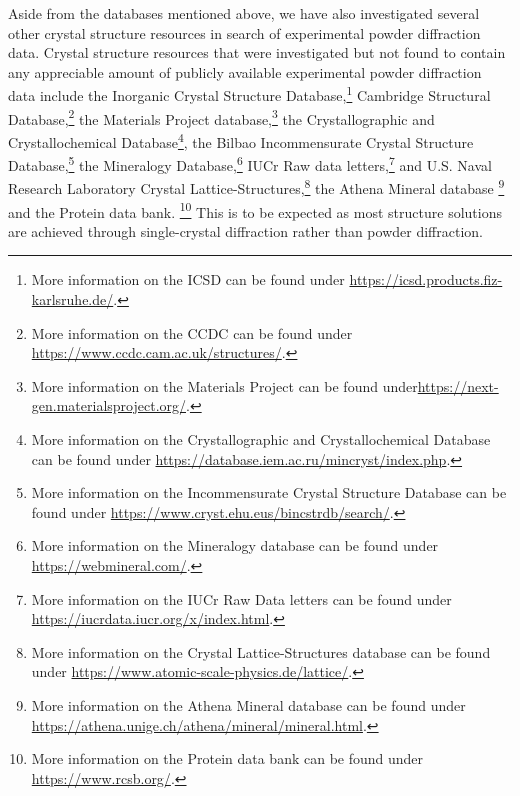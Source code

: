 Aside from the databases mentioned above, we have also investigated several other crystal structure resources in search of experimental powder diffraction data. Crystal structure resources that were investigated but not found to contain any appreciable amount of publicly available experimental powder diffraction data include the Inorganic Crystal Structure Database,\footnote{More information on the ICSD can be found under \url{https://icsd.products.fiz-karlsruhe.de/}.}   Cambridge Structural Database,\footnote{More information on the CCDC can be found under \url{https://www.ccdc.cam.ac.uk/structures/}.}  the Materials Project database,\footnote{More information on the Materials Project can be found under\url{https://next-gen.materialsproject.org/}.}  the Crystallographic and Crystallochemical Database\footnote{More information on the Crystallographic and Crystallochemical Database can be found under \url{https://database.iem.ac.ru/mincryst/index.php}.},  the Bilbao Incommensurate Crystal Structure Database,\footnote{More information on the Incommensurate Crystal Structure Database can be found under \url{https://www.cryst.ehu.eus/bincstrdb/search/}.}  the Mineralogy Database,\footnote{More information on the Mineralogy database can be found under \url{https://webmineral.com/}.} IUCr Raw data letters,\footnote{More information on the IUCr Raw Data letters can be found under \url{https://iucrdata.iucr.org/x/index.html}.} and U.S. Naval Research Laboratory Crystal Lattice-Structures,\footnote{More information on the Crystal Lattice-Structures database can be found under \url{https://www.atomic-scale-physics.de/lattice/}.} the Athena Mineral database \footnote{More information on the Athena Mineral database can be found under \url{https://athena.unige.ch/athena/mineral/mineral.html}.} and the Protein data bank. \footnote{More information on the Protein data bank can be found under \url{https://www.rcsb.org/}.} This is to be expected as most structure solutions are achieved through single-crystal diffraction rather than powder diffraction.\\

